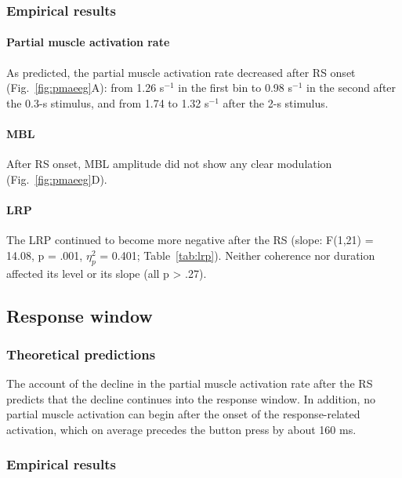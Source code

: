 \documentclass[a4paper,11pt]{article}
\theoremstyle{definition}
\newcommand{\1}{\mathbbm{1}}
\begin{document}
\subsubsection{Empirical results}

\paragraph{Partial muscle activation rate}

As predicted, the partial muscle activation rate decreased after RS onset (Fig.~\ref{fig:pmaeeg}A): from 1.26 s$^{-1}$ in the first bin to 0.98 s$^{-1}$ in the second after the 0.3-s stimulus, and from 1.74 to 1.32 s$^{-1}$ after the 2-s stimulus.

\paragraph{MBL}

After RS onset, MBL amplitude did not show any clear modulation (Fig.~\ref{fig:pmaeeg}D).

\paragraph{LRP}

The LRP continued to become more negative after the RS (slope: F(1,21) = 14.08, p = .001, $\eta_{p}^{2}$ = 0.401; Table~\ref{tab:lrp}). Neither coherence nor duration affected its level or its slope (all p > .27).


\subsection{Response window}


\subsubsection{Theoretical predictions}

The account of the decline in the partial muscle activation rate after the RS predicts that the decline continues into the response window. In addition, no partial muscle activation can begin after the onset of the response-related activation, which on average precedes the button press by about 160 ms.


\subsubsection{Empirical results}
\end{document}
